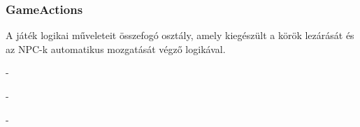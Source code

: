 \subsubsection{GameActions}
\begin{class-template-responsibility}
    A játék logikai műveleteit összefogó osztály, amely kiegészült a körök lezárását és az NPC-k automatikus mozgatását végző logikával.
\end{class-template-responsibility}
\begin{class-template-interface}
    -
\end{class-template-interface}
\begin{class-template-baseclass}
    -
\end{class-template-baseclass}
\begin{class-template-attribute}
    -
\end{class-template-attribute}
\begin{class-template-method}
\end{class-template-method}

